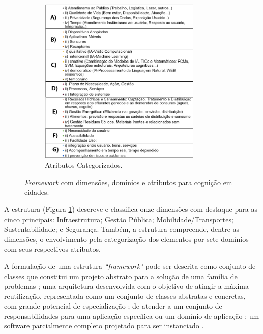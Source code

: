 \documentclass[portuguese]{textolivre}
\begin{document}
\clearpage

\begin{figure}[h!]
    \ContinuedFloat %
    \centering

    \begin{subfigure}[b]{\textwidth}
        \centering
        \includegraphics[width=0.85\textwidth,keepaspectratio]{images/FIGURA1_C.png}
        \caption{Atributos Categorizados.}
    
    \end{subfigure}

    \caption{\textit{Framework} com dimensões, domínios e atributos para cognição em cidades.}\label{fig-1}
\end{figure}

A estrutura (Figura \ref{fig-1}) descreve e classifica onze dimensões com destaque para as cinco principais: Infraestrutura; Gestão Pública; Mobilidade/Transportes; Sustentabilidade; e Segurança. Também, a estrutura compreende, dentre as dimensões, o envolvimento pela categorização dos elementos por sete domínios com seus respectivos atributos.

A formulação de uma estrutura \textit{``framework"} pode ser descrita como conjunto de classes que constitui um projeto abstrato para a solução de uma família de problemas \cite{fayad1999, johnson1988}; uma arquitetura desenvolvida com o objetivo de atingir a máxima reutilização, representada como um conjunto de classes abstratas e concretas, com grande potencial de especialização \cite{mattsson2000}; de atender a um conjunto de responsabilidades para uma aplicação específica ou um domínio de aplicação \cite{johnson1991, gamma1995}; um software parcialmente completo projetado para ser instanciado \cite{buschmann1996}.
\end{document}
